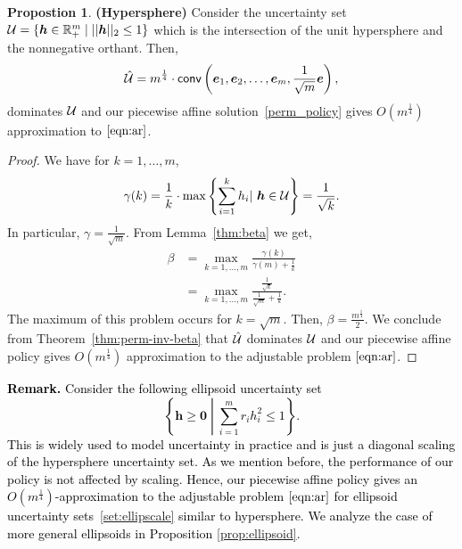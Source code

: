 \documentclass[11pt]{article}
\theoremstyle{plain}
\theoremstyle{definition}
\newtheorem{prop}[theorem]{Propostion}
\numberwithin{equation}{section}%
\numberwithin{equation}{section}%
\newcommand{\mb}[1]{\ensuremath{\boldsymbol{#1}}}
\newcommand*{\red}{\textcolor{black}}
\begin{document}
\begin{prop} {\bf (Hypersphere)} \label{prop:sphere}
Consider the uncertainty set ${\cal U}=\{\mb{h}\in{\mathbb R}^{m}_+\;|\;||\mb{h}||_2 \leq 1\}$ which is the intersection of the unit hypersphere and the nonnegative orthant. Then,
\[\hat{\cal U}=m^{\frac{1}{4}} \cdot{\sf conv}\left(\mb{e}_1, \mb{e}_2,\ldots, \mb{e}_m, \frac{1}{\sqrt{m}}\mb{e} \right),\]
dominates ${\cal U}$ and our piecewise affine solution~\eqref{perm_policy} gives $O  ( m^{\frac{1}{4}} )$ approximation to $\eqref{eqn:ar}$.
\end{prop}
\begin{proof}
We have for $k=1,\ldots,m$,
$$ \gamma(k)   = \frac{1}{k} \cdot \max \left\{ \sum_{i=1}^k h_i \vert\ \mb h \in {\cal U} \right\} = \frac{1}{\sqrt{k}}.$$
In particular, $\gamma = \frac{1}{\sqrt{m}}$. From Lemma~\ref{thm:beta} we get,
\begin{align*}
\beta  &= \max _{ k=1,\ldots,m}  \frac{\gamma(k)}{\gamma (m) +\frac{1}{k}} \\
& = \max _{ k=1,\ldots,m}  \frac{\frac{1}{\sqrt{k}}}{\frac{1}{\sqrt{m}} +\frac{1}{k}}.
\end{align*}
The maximum of this problem occurs for $ k = \sqrt{m}$. Then, $ \beta = \frac{m^{\frac{1}{4}}}{2} $.  We conclude from Theorem~\ref{thm:perm-inv-beta} that $\hat{\cal U}$ dominates ${\cal U}$ and our piecewise affine policy gives $O  ( m^{\frac{1}{4}} )$ approximation to the adjustable problem $\eqref{eqn:ar}$.
 \end{proof}

\noindent
\red{
\textbf{Remark.}
Consider the following ellipsoid uncertainty set
\begin{equation} \label{set:ellipscale}
\left\{ \mb h \geq \mb 0 \; \left | \;  \sum_{i=1}^m r_i h_i^ 2 \leq 1 \right.\right\}.
\end{equation}
This is widely used to model uncertainty in practice and is just a diagonal scaling of the hypersphere uncertainty set. As we mention before, the performance of our policy is not affected by scaling.
 Hence, our piecewise affine policy gives an $O  ( m^{\frac{1}{4}} )$-approximation  to the adjustable problem $\eqref{eqn:ar}$ for ellipsoid uncertainty sets~\eqref{set:ellipscale} similar to hypersphere. We analyze the case of more general ellipsoids in Proposition \ref{prop:ellipsoid}.
 }
\end{document}
